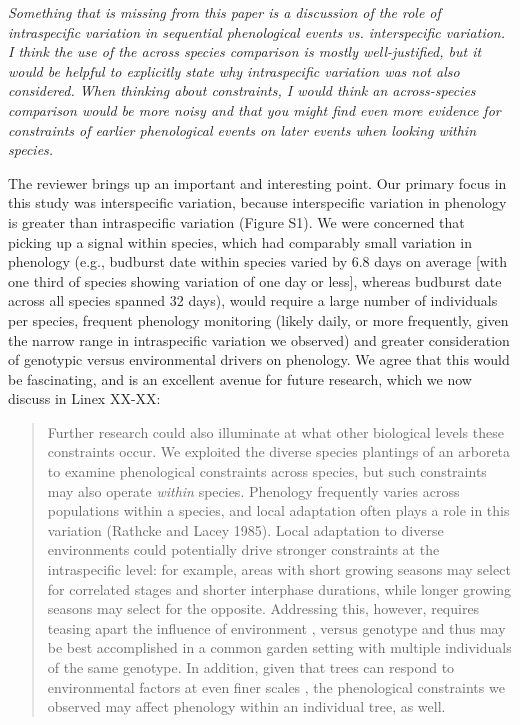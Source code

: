 \documentclass[10.95pt,a4paper]{letter}
\begin{document}
\par \emph{Something that is missing from this paper is a discussion of the role of intraspecific variation in sequential phenological events vs. interspecific variation.  I think the use of the across species comparison is mostly well-justified, but it would be helpful to explicitly state why intraspecific variation was not also considered.  When thinking about constraints, I would think an across-species comparison would be more noisy and that you might find even more evidence for constraints of earlier phenological events on later events when looking within species.}
\par The reviewer brings up an important and interesting point. Our primary focus in this study was interspecific variation, because interspecific variation in phenology is greater than intraspecific variation (Figure S1). We were concerned that picking up a signal within species, which had comparably small variation in phenology (e.g., budburst date within species varied by 6.8 days on average [with one third of species showing variation of one day or less], whereas budburst date across all species spanned 32 days), would require a large number of individuals per species, frequent phenology monitoring (likely daily, or more frequently, given the narrow range in intraspecific variation we observed) and greater consideration of genotypic versus environmental drivers on phenology. We agree that this would be fascinating, and is an excellent avenue for future research, which we now discuss in Linex XX-XX:

\begin{quote}
Further research could also illuminate at what other biological levels these constraints occur. We exploited the diverse species plantings of an arboreta to examine phenological constraints across species, but such constraints may also operate \emph{within} species. Phenology frequently varies across populations within a species, and local adaptation often plays a role in this variation (Rathcke and Lacey 1985). Local adaptation to diverse environments could potentially drive stronger constraints at the intraspecific level: for example, areas with short growing seasons may select for correlated stages and shorter interphase durations, while longer growing seasons may select for the opposite. Addressing this, however, requires teasing apart the influence of environment \citep[even to the microclimatic level][]{SCHWARTZ.IJBiomet.2013}, versus genotype and thus may be best accomplished in a common garden setting with multiple individuals of the same genotype. In addition, given that trees can respond  to environmental factors at even finer scales \citep[e.g., the branch level,][]{nakamura2010}, the phenological constraints we observed may affect phenology within an individual tree, as well. 
\end{quote}
\end{document}
